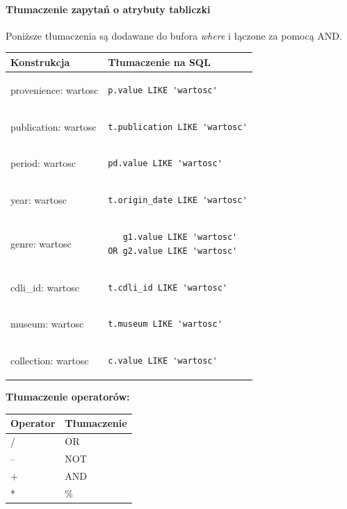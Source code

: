 \paragraph{Tłumaczenie zapytań o atrybuty tabliczki}
Poniższe tłumaczenia są dodawane do bufora \textit{where} i łączone za pomocą AND.
\begin{longtable}{|p{3in}|p{3in}|}
\hline
{\bf Konstrukcja} & {\bf Tłumaczenie na SQL}\\
\hline
\endhead
provenience: wartosc & \begin{verbatim}p.value LIKE 'wartosc'\end{verbatim}
\\
\hline
publication: wartosc & 
\begin{verbatim}
t.publication LIKE 'wartosc'
\end{verbatim}
\\
\hline
period: wartosc & 
\begin{verbatim}
pd.value LIKE 'wartosc'
\end{verbatim}
\\
\hline
year: wartosc & 
\begin{verbatim}
t.origin_date LIKE 'wartosc'
\end{verbatim}
\\
\hline
genre: wartosc & 
\begin{verbatim}
   g1.value LIKE 'wartosc' 
OR g2.value LIKE 'wartosc'
\end{verbatim}
\\
\hline
cdli\_id: wartosc & 
\begin{verbatim}
t.cdli_id LIKE 'wartosc'
\end{verbatim}
\\
\hline
museum: wartosc & 
\begin{verbatim}
t.museum LIKE 'wartosc'
\end{verbatim}
\\
\hline
collection: wartosc & 
\begin{verbatim}
c.value LIKE 'wartosc'
\end{verbatim}
\\
\hline
\end{longtable}

\textbf{Tłumaczenie operatorów:}
\begin{longtable}{|p{1in}|p{1in}|}
\hline
{\bf Operator} & {\bf Tłumaczenie}\\
\hline
\endhead
/ & OR\\ 
\hline
-- & NOT\\ 
\hline
+ & AND\\ 
\hline
* & \%  \\ 
\hline
\end{longtable}



